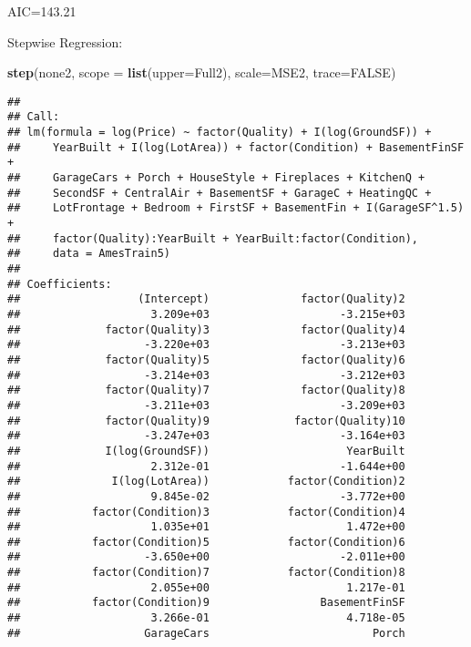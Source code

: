 \documentclass[
]{article}
\newenvironment{Shaded}{\begin{snugshade}}{\end{snugshade}}
\newcommand{\DataTypeTok}[1]{\textcolor[rgb]{0.13,0.29,0.53}{#1}}
\newcommand{\KeywordTok}[1]{\textcolor[rgb]{0.13,0.29,0.53}{\textbf{#1}}}
\newcommand{\NormalTok}[1]{#1}
\newcommand{\OtherTok}[1]{\textcolor[rgb]{0.56,0.35,0.01}{#1}}
\begin{document}
AIC=143.21

Stepwise Regression:

\begin{Shaded}
\begin{Highlighting}[]
\KeywordTok{step}\NormalTok{(none2, }\DataTypeTok{scope =} \KeywordTok{list}\NormalTok{(}\DataTypeTok{upper=}\NormalTok{Full2), }\DataTypeTok{scale=}\NormalTok{MSE2, }\DataTypeTok{trace=}\OtherTok{FALSE}\NormalTok{)}
\end{Highlighting}
\end{Shaded}

\begin{verbatim}
## 
## Call:
## lm(formula = log(Price) ~ factor(Quality) + I(log(GroundSF)) + 
##     YearBuilt + I(log(LotArea)) + factor(Condition) + BasementFinSF + 
##     GarageCars + Porch + HouseStyle + Fireplaces + KitchenQ + 
##     SecondSF + CentralAir + BasementSF + GarageC + HeatingQC + 
##     LotFrontage + Bedroom + FirstSF + BasementFin + I(GarageSF^1.5) + 
##     factor(Quality):YearBuilt + YearBuilt:factor(Condition), 
##     data = AmesTrain5)
## 
## Coefficients:
##                  (Intercept)              factor(Quality)2  
##                    3.209e+03                    -3.215e+03  
##             factor(Quality)3              factor(Quality)4  
##                   -3.220e+03                    -3.213e+03  
##             factor(Quality)5              factor(Quality)6  
##                   -3.214e+03                    -3.212e+03  
##             factor(Quality)7              factor(Quality)8  
##                   -3.211e+03                    -3.209e+03  
##             factor(Quality)9             factor(Quality)10  
##                   -3.247e+03                    -3.164e+03  
##             I(log(GroundSF))                     YearBuilt  
##                    2.312e-01                    -1.644e+00  
##              I(log(LotArea))            factor(Condition)2  
##                    9.845e-02                    -3.772e+00  
##           factor(Condition)3            factor(Condition)4  
##                    1.035e+01                     1.472e+00  
##           factor(Condition)5            factor(Condition)6  
##                   -3.650e+00                    -2.011e+00  
##           factor(Condition)7            factor(Condition)8  
##                    2.055e+00                     1.217e-01  
##           factor(Condition)9                 BasementFinSF  
##                    3.266e-01                     4.718e-05  
##                   GarageCars                         Porch  

\end{verbatim}
\end{document}
